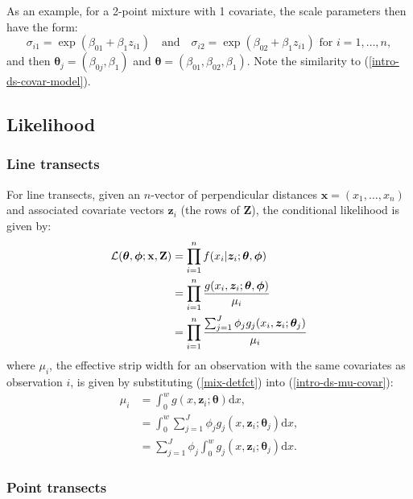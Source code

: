 As an example, for a 2-point mixture with 1 covariate, the scale parameters then have the form:
\begin{equation*}
\sigma_{i1} = \exp( \beta_{01} + \beta_1 z_{i1}) \quad \text{and} \quad \sigma_{i2} = \exp( \beta_{02} + \beta_1 z_{i1}) \text{ for } i=1,\ldots,n,
\end{equation*}
and then $\bm{\theta}_j = (\beta_{0j}, \beta_1)$ and $\bm{\theta} = (\beta_{01}, \beta_{02}, \beta_1)$. Note the similarity to (\ref{intro-ds-covar-model}).

\subsection{Likelihood}

\subsubsection{Line transects}

\label{cor-8s5}For line transects, given an $n$-vector of perpendicular distances $\mathbf{x}=\left ( x_1,\ldots,x_n \right )$ and associated covariate vectors $\bm{z}_i$ (the rows of $\mathbf{Z}$), the conditional likelihood is given by:
\begin{align}
\mathcal{L}(\bm{\theta},\bm{\phi}; \mathbf{x},\mathbf{Z}) &= \prod_{i=1}^n f(x_i \vert \bm{z}_i; \bm{\theta},\bm{\phi}) \notag \\
&= \prod_{i=1}^n \frac{g(x_i,\bm{z}_i; \bm{\theta},\bm{\phi})}{\mu_i} \notag \\
&= \prod_{i=1}^n \frac{\sum_{j=1}^J \phi_j g_j(x_i,\bm{z}_i; \bm{\theta}_j)}{\mu_i} \label{lt-lik}
\end{align}
where $\mu_i$, the effective strip width for an observation with the same covariates as observation $i$, is given by substituting (\ref{mix-detfct}) into (\ref{intro-ds-mu-covar}):
\begin{align*}
\mu_{i} &= \int_0^w  g(x,\bm{z}_i; \bm{\theta}) \text{d}x,\\
& =  \int_0^w  \sum_{j=1}^J \phi_j g_j(x,\bm{z}_i; \bm{\theta}_j) \text{d}x,\\
& = \sum_{j=1}^J \phi_j \int_0^w  g_j(x,\bm{z}_i; \bm{\theta}_j) \text{d}x.
\end{align*}\label{cor-8s6}

\subsubsection{Point transects}

